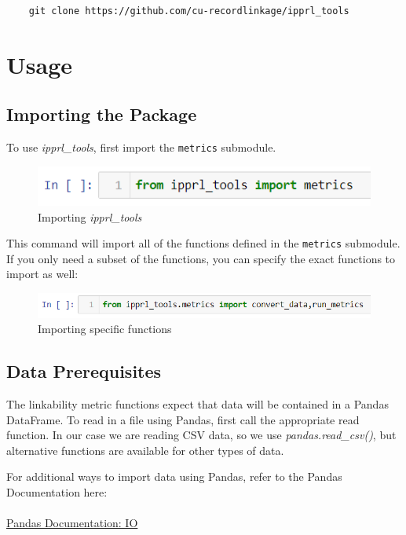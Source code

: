 \documentclass[titlepage, 11pt]{article}
\newcommand{\pkgname}{\textit{ipprl\_tools}}
\begin{document}
\begin{verbatim}
    git clone https://github.com/cu-recordlinkage/ipprl_tools
\end{verbatim}

\section{Usage}
\subsection{Importing the Package}
\label{imprt}
To use \pkgname{}, first import the \verb|metrics| submodule. 
\begin{figure}[H]
    \centering
    \includegraphics{imgs/ImportDoc.PNG}
    \caption{Importing \pkgname{}}
    \label{fig:my_label}
\end{figure}

\noindent This command will import all of the functions defined in the \verb|metrics| submodule. If you only need a subset of the functions, you can specify the exact functions to import as well:

\begin{figure}[H]
    \centering
    \includegraphics{imgs/ImportDocFunctions.PNG}
    \caption{Importing specific functions}
    \label{fig:my_label}
\end{figure}

\subsection{Data Prerequisites}
\label{data_prereqs}
The linkability metric functions expect that data will be contained in a Pandas DataFrame. To read in a file using Pandas, first call the appropriate read function. In our case we are reading CSV data, so we use \textit{pandas.read\_csv()}, but alternative functions are available for other types of data.

\noindent For additional ways to import data using Pandas, refer to the Pandas Documentation here:
\\
\\
\href{https://pandas.pydata.org/pandas-docs/stable/user_guide/io.html}{Pandas Documentation: IO}
\\
\end{document}
